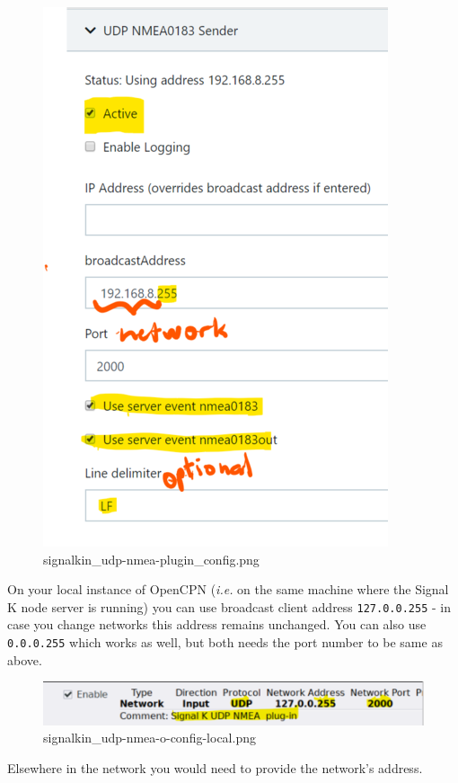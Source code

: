 \documentclass[11pt]{article}
\begin{document}
    \begin{figure}
\centering
\includegraphics{signalkin_udp-nmea-plugin_config.png}
\caption{signalkin\_udp-nmea-plugin\_config.png}
\end{figure}

    On your local instance of OpenCPN (\emph{i.e.} on the same machine where
the Signal K node server is running) you can use broadcast client
address \texttt{127.0.0.255} - in case you change networks this address
remains unchanged. You can also use \texttt{0.0.0.255} which works as
well, but both needs the port number to be same as above.

    \begin{figure}
\centering
\includegraphics{signalkin_udp-nmea-o-config-local.png}
\caption{signalkin\_udp-nmea-o-config-local.png}
\end{figure}

    Elsewhere in the network you would need to provide the network's
address.
\end{document}
